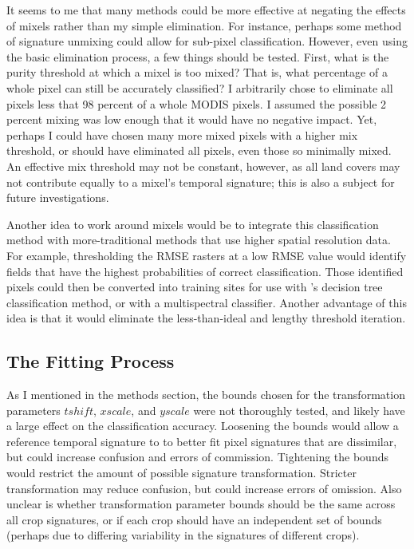 It seems to me that many methods could be more effective at negating the effects of mixels rather than my simple elimination. For instance, perhaps some method of signature unmixing could allow for sub-pixel classification. However, even using the basic elimination process, a few things should be tested. First, what is the purity threshold at which a mixel is too mixed? That is, what percentage of a whole pixel can still be accurately classified? I arbitrarily chose to eliminate all pixels less that 98 percent of a whole MODIS pixels. I assumed the possible 2 percent mixing was low enough that it would have no negative impact. Yet, perhaps I could have chosen many more mixed pixels with a higher mix threshold, or should have eliminated all pixels, even those so minimally mixed. An effective mix threshold may not be constant, however, as all land covers may not contribute equally to a mixel's temporal signature; this is also a subject for future investigations.

Another idea to work around mixels would be to integrate this classification method with more-traditional methods that use higher spatial resolution data. For example, thresholding the RMSE rasters at a low RMSE value would identify fields that have the highest probabilities of correct classification. Those identified pixels could then be converted into training sites for use with \citeauthor{wardlow2005state-level}'s decision tree classification method, or with a multispectral classifier. Another advantage of this idea is that it would eliminate the less-than-ideal and lengthy threshold iteration.

\subsection{The Fitting Process}

As I mentioned in the methods section, the bounds chosen for the transformation parameters $tshift$, $xscale$, and $yscale$ were not thoroughly tested, and likely have a large effect on the classification accuracy. Loosening the bounds would allow a reference temporal signature to to better fit pixel signatures that are dissimilar, but could increase confusion and errors of commission. Tightening the bounds would restrict the amount of possible signature transformation. Stricter transformation may reduce confusion, but could increase errors of omission. Also unclear is whether transformation parameter bounds should be the same across all crop signatures, or if each crop should have an independent set of bounds (perhaps due to differing variability in the signatures of different crops).


